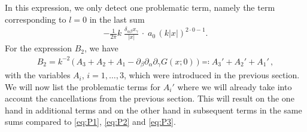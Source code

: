 In this expression, we only detect one problematic term, namely the term corresponding to $l = 0$ in the last sum
\begin{align}
  \label{eq:Q1}
  \tag{Q1}
  -\frac{1}{2\pi} k\;  \frac{\delta_{\alpha\beta} x_\gamma}{|x|}\, \cdot \; a_0 \, (k|x|)^{2 \cdot 0 - 1} .
\end{align}
For the expression $B_2$, we have  
\begin{align*}
  B_2 = k^{-2} \, \Big( \, A_3 + A_2 + A_1 - \partial_\beta\partial_\alpha\partial_\gamma G(x; 0)\, \Big) \eqqcolon A_3' + A_2' + A_1'\,,
\end{align*}
with the variables $A_i$, $i = 1, \dots, 3$, which were introduced in the previous section. 
We will now list the problematic terms for $A_i'$ where we will already take into account the cancellations from the previous section.
This will result on the one hand in additional terms and on the other hand in subsequent terms in the same sums compared to \eqref{eq:P1}, \eqref{eq:P2} and \eqref{eq:P3}.

